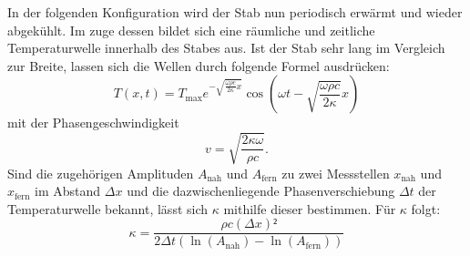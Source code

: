 In der folgenden Konfiguration wird der Stab nun periodisch erwärmt und
 wieder abgekühlt.
 Im zuge dessen bildet sich eine räumliche und zeitliche Temperaturwelle
  innerhalb des Stabes aus. Ist der Stab sehr lang im Vergleich zur Breite, lassen
   sich die Wellen durch folgende Formel ausdrücken:
  \begin{equation}
    T(x,t) = T_\text{max}e^{-\sqrt{{\frac{\omega \rho c}{2\kappa}}x}}\cos \left( \omega t - \sqrt{\frac{\omega \rho c}{2\kappa}}x \right)\label{eq:form5}
  \end{equation}
mit der Phasengeschwindigkeit
\begin{equation}
  v = \sqrt{\frac{2 \kappa \omega}{\rho c}}\text{.}\label{eq:form6}
\end{equation}
Sind die zugehörigen Amplituden $A_\text{nah}$ und $A_\text{fern}$ zu zwei Messstellen
$x_\text{nah}$ und $x_\text{fern}$ im Abstand $\Delta x$ und die dazwischenliegende Phasenverschiebung $\Delta t$
 der Temperaturwelle bekannt, lässt sich $\kappa$ mithilfe dieser bestimmen. Für $\kappa$ folgt:
 \begin{equation}
   \kappa = \frac{\rho c (\Delta x)²}{2 \Delta t (\ln(A_\text{nah})-\ln(A_\text{fern}))}\label{eq:form7}
 \end{equation}
